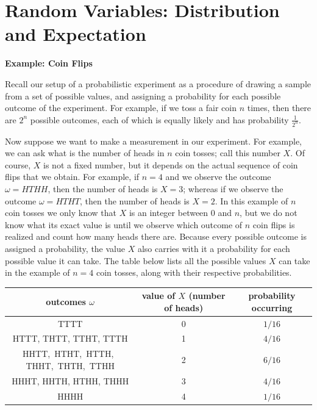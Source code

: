 \documentclass[11pt]{article}
\begin{document}
\maketitle

\section*{Random Variables: Distribution and Expectation}

{\bf Example: Coin Flips}

\smallskip

Recall our setup of a probabilistic experiment as a procedure of drawing a sample from
a set of possible values, and assigning a probability for each possible outcome of the experiment.
For example, if we toss a fair coin $n$ times, then there are $2^n$ possible outcomes, each of which
is equally likely and has probability $\frac{1}{2^n}$.

Now suppose we want to make a measurement in our experiment. For example, we can ask
what is the number of heads in $n$ coin tosses; call this number $X$. Of course, $X$ is not a fixed number,
but it depends on the actual sequence of coin flips that we obtain. For example, if $n = 4$ and
we observe the outcome $\omega = HTHH$, then the number of heads is $X = 3$; whereas if we
observe the outcome $\omega = HTHT$, then the number of heads is $X = 2$. In this example of $n$ coin tosses
we only know that $X$ is an integer between $0$ and $n$, but we do not know what its exact value is
until we observe which outcome of $n$ coin flips is realized and count how many heads there are. Because
every possible outcome is assigned a probability, the value $X$ also carries with it a probability for each possible
value it can take. The table below lists all the possible values $X$ can take in the example of $n = 4$ coin tosses,
along with their respective probabilities.

\begin{center}\begin{tabular}{|c|c|c|}
\hline
outcomes $\omega$ & value of $X$ (number of heads) & probability occurring \\ \hline
TTTT & 0 & $1/16$ \\
HTTT, \:THTT, \:TTHT, \:TTTH & 1 & $4/16$ \\
HHTT, \,HTHT, \,HTTH, \,THHT, \,THTH, \,TTHH & 2 & $6/16$ \\
HHHT, \:HHTH, \:HTHH, \:THHH & 3 & $4/16$ \\
HHHH & 4 & $1/16$ \\ \hline
\end{tabular}\end{center}
\end{document}
